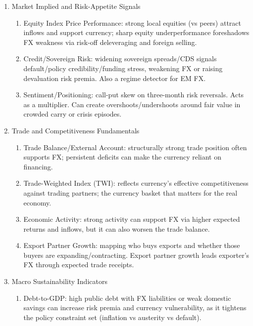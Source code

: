\begin{remark} 
\begin{enumerate}[label=\roman*.]
\setlength{\itemsep}{0pt}
\item Market Implied and Risk-Appetite Signals
\begin{enumerate}[label=\arabic*.]
\setlength{\itemsep}{0pt}
\item Equity Index Price Performance: strong local equities (vs peers) attract inflows and support currency; sharp equity underperformance foreshadows FX weakness via risk-off deleveraging and foreign selling.
\item Credit/Sovereign Risk: widening sovereign spreads/CDS signals default/policy credibility/funding stress, weakening FX or raising devaluation risk premia. Also a regime detector for EM FX.
\item Sentiment/Positioning: call-put skew on three-month risk reversals. Acts as a multiplier. Can create overshoots/undershoots around fair value in crowded carry or crisis episodes.
\end{enumerate}
\item Trade and Competitiveness Fundamentals
\begin{enumerate}[label=\arabic*.]
\setlength{\itemsep}{0pt}
\item Trade Balance/External Account: structurally strong trade position often supports FX; persistent deficits can make the currency reliant on financing.
\item Trade-Weighted Index (TWI): reflects currency's effective competitiveness against trading partners; the currency basket that matters for the real economy.
\item Economic Activity: strong activity can support FX via higher expected returns and inflows, but it can also worsen the trade balance.
\item Export Partner Growth: mapping who buys exports and whether those buyers are expanding/contracting. Export partner growth leads exporter's FX through expected trade receipts.
\end{enumerate}
\item Macro Sustainability Indicators
\begin{enumerate}[label=\arabic*.]
\setlength{\itemsep}{0pt}
\item Debt-to-GDP: high public debt with FX liabilities or weak domestic savings can increase risk premia and currency vulnerability, as it tightens the policy constraint set (inflation vs austerity vs default).

\end{enumerate}
\end{enumerate}
\end{remark}
